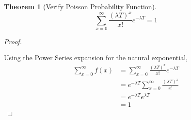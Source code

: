 \documentclass[10pt,]{book}
\theoremstyle{plain}
\newtheorem{theorem}{Theorem}[section]
\theoremstyle{definition}
\theoremstyle{definition}
\theoremstyle{definition}
\numberwithin{equation}{section}
\begin{document}
\begin{theorem}[{Verify Poisson Probability Function}]\label{theorem-47}
\begin{equation*}\sum_{x=0}^{\infty} \frac{(\lambda T)^x}{x!} e^{-\lambda T} = 1\end{equation*}\end{theorem}
\begin{proof}\hypertarget{proof-46}{}
Using the Power Series expansion for the natural exponential,
\begin{align*}
 \sum_{x=0}^{\infty} f(x) & = \sum_{x=0}^{\infty} \frac{(\lambda T)^x}{x!} e^{-\lambda T} \\
 & = e^{-\lambda T} \sum_{x=0}^{\infty} \frac{(\lambda T)^x}{x!} \\
 & = e^{-\lambda T} e^{\lambda T}  \\
 & = 1
\end{align*}
%
\end{proof}
\end{document}
